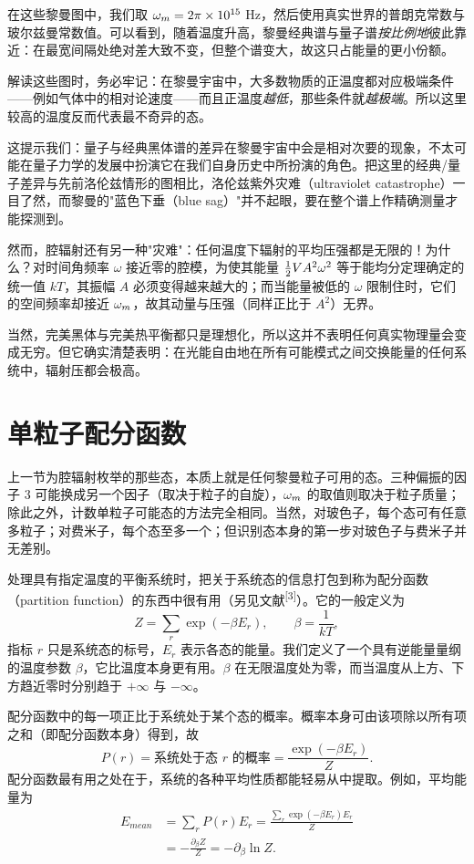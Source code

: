 在这些黎曼图中，我们取 $\omega_m=2\pi\times10^{15}$ Hz，然后使用真实世界的普朗克常数与玻尔兹曼常数值。可以看到，随着温度升高，黎曼经典谱与量子谱\emph{按比例地}彼此靠近：在最宽间隔处绝对差大致不变，但整个谱变大，故这只占能量的更小份额。

解读这些图时，务必牢记：在黎曼宇宙中，大多数物质的正温度都对应极端条件——例如气体中的相对论速度——而且正温度\emph{越低}，那些条件就\emph{越极端}。所以这里较高的温度反而代表最不奇异的态。

这提示我们：量子与经典黑体谱的差异在黎曼宇宙中会是相对次要的现象，不太可能在量子力学的发展中扮演它在我们自身历史中所扮演的角色。把这里的经典/量子差异与先前洛伦兹情形的图相比，洛伦兹紫外灾难（ultraviolet catastrophe）一目了然，而黎曼的"蓝色下垂（blue sag）"并不起眼，要在整个谱上作精确测量才能探测到。

然而，腔辐射还有另一种"灾难"：任何温度下辐射的平均压强都是无限的！为什么？对时间角频率 $\omega$ 接近零的腔模，为使其能量 $\tfrac{1}{2} V A^{2}\omega^{2}$ 等于能均分定理确定的统一值 $kT$，其振幅 $A$ 必须变得越来越大的；而当能量被低的 $\omega$ 限制住时，它们的空间频率却接近 $\omega_m$，故其动量与压强（同样正比于 $A^{2}$）无界。

当然，完美黑体与完美热平衡都只是理想化，所以这并不表明任何真实物理量会变成无穷。但它确实清楚表明：在光能自由地在所有可能模式之间交换能量的任何系统中，辐射压都会极高。

\section{单粒子配分函数}

上一节为腔辐射枚举的那些态，本质上就是任何黎曼粒子可用的态。三种偏振的因子 $3$ 可能换成另一个因子（取决于粒子的自旋），$\omega_m$ 的取值则取决于粒子质量；除此之外，计数单粒子可能态的方法完全相同。当然，对玻色子，每个态可有任意多粒子；对费米子，每个态至多一个；但识别态本身的第一步对玻色子与费米子并无差别。

处理具有指定温度的平衡系统时，把关于系统态的信息打包到称为配分函数（partition function）的东西中很有用（另见文献\textsuperscript{[3]}）。它的一般定义为
\begin{equation}
Z=\sum_{r}\exp(-\beta E_{r}),\qquad \beta=\frac{1}{kT},
\end{equation}
指标 $r$ 只是系统态的标号，$E_{r}$ 表示各态的能量。我们定义了一个具有逆能量量纲的温度参数 $\beta$，它比温度本身更有用。$\beta$ 在无限温度处为零，而当温度从上方、下方趋近零时分别趋于 $+\infty$ 与 $-\infty$。

配分函数中的每一项正比于系统处于某个态的概率。概率本身可由该项除以所有项之和（即配分函数本身）得到，故
\begin{equation}
P(r)=\text{系统处于态 }r\text{ 的概率}=\frac{\exp(-\beta E_{r})}{Z}.
\end{equation}
配分函数最有用之处在于，系统的各种平均性质都能轻易从中提取。例如，平均能量为
\begin{align}
E_{mean}
&=\sum_{r}P(r)E_{r}
=\frac{\sum_{r}\exp(-\beta E_{r})E_{r}}{Z} \nonumber\\
&=-\frac{\partial_{\beta}Z}{Z}
=-\partial_{\beta}\ln Z .
\end{align}

